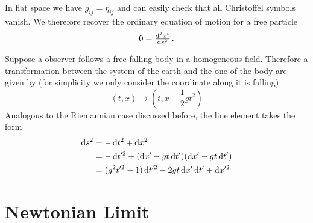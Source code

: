 In flat space we have $g_{ij}=\eta_{ij}$ and can easily check that all
Christoffel symbols vanish. We therefore recover the ordinary equation of motion for a free particle
\begin{equation}
    0 = \od[2]{x^i}{s}\, .
\end{equation}
\begin{example}
Suppose a observer follows a free falling body in a homogeneous field. 
Therefore a transformation between the system of the earth and the one of the body are given by 
(for simplicity we only consider the coordinate along it is falling)
\begin{equation}
    (t,x)\to\left(t,x-\frac{1}{2}gt^2\right)
\end{equation}
Analogous to the Riemannian case discussed before, the line element takes the form
\begin{equation}
    \begin{split}
	    \dif s^2&=-\dif t^2 +\dif x^2\\
	    &=-\dif t'^2+(\dif x'- gt\dif t')(\dif x'- gt\dif t')\\
	    &=(g^2t'^2-1)\dif t'^2-2gt\dif x'\dif t'+\dif x'^2
    \end{split}
\end{equation}
\end{example}
\section{Newtonian Limit}